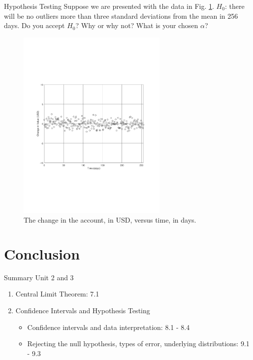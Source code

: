 \documentclass{beamer}
\begin{document}
\begin{frame}[fragile]{Hypothesis Testing}
\small
Suppose we are presented with the data in Fig. \ref{fig:randnpdf2}.  $H_0$: there will be no outliers more than three standard deviations from the mean in 256 days.  Do you accept $H_0$?  Why or why not?  What is your chosen $\alpha$?
\begin{figure}
\centering
\includegraphics[width=0.65\textwidth,trim=0cm 7cm 0cm 5cm,clip=true]{figures/randn.pdf}
\caption{\label{fig:randnpdf2} The change in the account, in USD, versus time, in days.}
\end{figure}
\end{frame}

\section{Conclusion}

\begin{frame}{Summary}
Unit 2 and 3
\begin{enumerate}
\item Central Limit Theorem: 7.1
\item Confidence Intervals and Hypothesis Testing
\begin{itemize}
\item Confidence intervals and data interpretation: 8.1 - 8.4
\item Rejecting the null hypothesis, types of error, underlying distributions: 9.1 - 9.3
\end{itemize}
\end{enumerate}
\end{frame}
\end{document}
